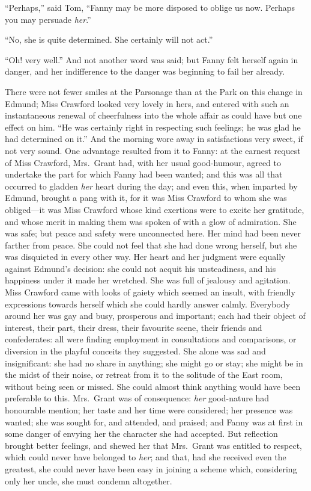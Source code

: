 ``Perhaps,'' said Tom, ``Fanny may be more disposed to oblige
us now.  Perhaps you may persuade \emph{her}.''

``No, she is quite determined.  She certainly will not act.''

``Oh! very well.''  And not another word was said; but Fanny
felt herself again in danger, and her indifference
to the danger was beginning to fail her already.

There were not fewer smiles at the Parsonage than at the Park
on this change in Edmund; Miss Crawford looked very lovely
in hers, and entered with such an instantaneous renewal
of cheerfulness into the whole affair as could have but
one effect on him.  ``He was certainly right in respecting
such feelings; he was glad he had determined on it.''
And the morning wore away in satisfactions very sweet,
if not very sound.  One advantage resulted from it
to Fanny:  at the earnest request of Miss Crawford,
Mrs.\ Grant had, with her usual good-humour, agreed
to undertake the part for which Fanny had been wanted;
and this was all that occurred to gladden \emph{her} heart
during the day; and even this, when imparted by Edmund,
brought a pang with it, for it was Miss Crawford to
whom she was obliged---it was Miss Crawford whose kind
exertions were to excite her gratitude, and whose merit
in making them was spoken of with a glow of admiration.
She was safe; but peace and safety were unconnected here.
Her mind had been never farther from peace.  She could
not feel that she had done wrong herself, but she was
disquieted in every other way.  Her heart and her judgment
were equally against Edmund's decision:  she could not
acquit his unsteadiness, and his happiness under it made
her wretched.  She was full of jealousy and agitation.
Miss Crawford came with looks of gaiety which seemed
an insult, with friendly expressions towards herself
which she could hardly answer calmly.  Everybody around
her was gay and busy, prosperous and important; each had
their object of interest, their part, their dress,
their favourite scene, their friends and confederates:
all were finding employment in consultations and comparisons,
or diversion in the playful conceits they suggested.
She alone was sad and insignificant:  she had no share
in anything; she might go or stay; she might be in the
midst of their noise, or retreat from it to the solitude
of the East room, without being seen or missed.  She could
almost think anything would have been preferable to this.
Mrs.\ Grant was of consequence:  \emph{her} good-nature had
honourable mention; her taste and her time were considered;
her presence was wanted; she was sought for, and attended,
and praised; and Fanny was at first in some danger
of envying her the character she had accepted.
But reflection brought better feelings, and shewed her
that Mrs.\ Grant was entitled to respect, which could never
have belonged to \emph{her}; and that, had she received even
the greatest, she could never have been easy in joining
a scheme which, considering only her uncle, she must
condemn altogether.

